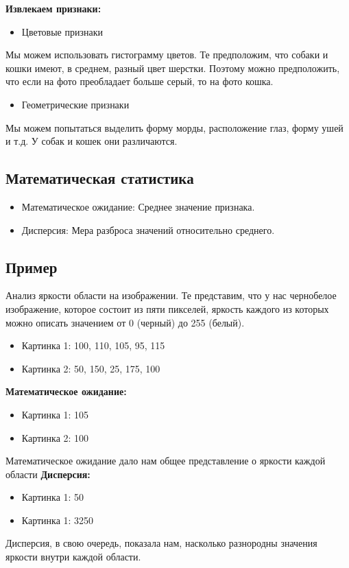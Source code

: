 \*

\textbf{Извлекаем признаки:}

\begin{itemize}
    \item Цветовые признаки
\end{itemize}
Мы можем использовать гистограмму цветов. Те предположим, что
собаки и кошки имеют, в среднем, разный цвет шерстки. Поэтому
можно предположить, что если на фото преобладает больше серый,
то на фото кошка.
\begin{itemize}
    \item Геометрические признаки
\end{itemize}
Мы можем попытаться выделить форму морды, расположение глаз,
форму ушей и т.д. У собак и кошек они различаются.

\newpage
\subsection{Математическая статистика}
\begin{itemize}
    \item Математическое ожидание: Среднее значение признака.
    \item Дисперсия: Мера разброса значений относительно среднего.
\end{itemize}
\subsection*{Пример}
Анализ яркости области на изображении. Те представим, что у нас чернобелое изображение, которое состоит из пяти пикселей, яркость каждого из
которых можно описать значением от 0 (черный) до 255 (белый).
\begin{itemize}
    \item Картинка 1: 100, 110, 105, 95, 115
    \item Картинка 2: 50, 150, 25, 175, 100
\end{itemize}
\textbf{Математическое ожидание:}
\begin{itemize}
    \item Картинка 1: 105
    \item Картинка 2: 100
\end{itemize}
Математическое ожидание дало нам общее представление о яркости
каждой области
\textbf{Дисперсия:}
\begin{itemize}
    \item Картинка 1: 50
    \item Картинка 1: 3250
\end{itemize}
Дисперсия, в свою очередь, показала нам, насколько разнородны значения яркости внутри каждой области.

